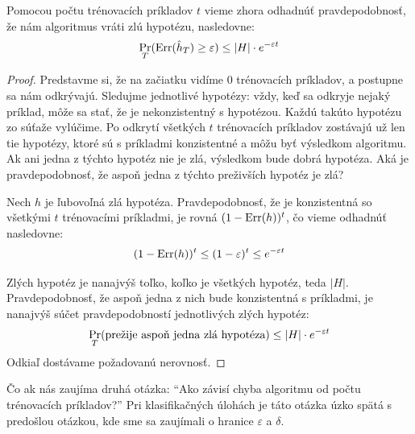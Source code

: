 \begin{theorem} \label{thm:badhypobound}
  Pomocou počtu trénovacích príkladov $t$ vieme zhora odhadnúť
  pravdepodobnosť, že nám algoritmus vráti zlú hypotézu, nasledovne:
  $$ \operatorname*{\textstyle\mathrm{Pr}}_T(\mathrm{Err}(\hat{h}_T) \geq \varepsilon) \leq |H| \cdot e^{-\varepsilon t} $$
\end{theorem}
\begin{proof}
  Predstavme si, že na začiatku vidíme $0$ trénovacích príkladov,
  a postupne sa nám odkrývajú. Sledujme jednotlivé hypotézy: vždy,
  keď sa odkryje nejaký príklad, môže sa stať, že je nekonzistentný
  s hypotézou. Každú takúto hypotézu zo súťaže vylúčime. Po odkrytí
  všetkých $t$ trénovacích príkladov zostávajú už len tie hypotézy,
  ktoré sú s príkladmi konzistentné a môžu byť výsledkom algoritmu.
  Ak ani jedna z týchto hypotéz nie je zlá, výsledkom bude dobrá
  hypotéza. Aká je pravdepodobnosť, že aspoň jedna z týchto preživších
  hypotéz je zlá?
  
  Nech $h$ je ľubovoľná zlá hypotéza. Pravdepodobnosť, že je konzistentná
  so všetkými $t$ trénovacími príkladmi, je rovná $(1 - \mathrm{Err}(h))^t$,
  čo vieme odhadnúť nasledovne:
  $$(1 - \mathrm{Err}(h))^t \leq (1 - \varepsilon)^t \leq e^{-\varepsilon t}$$
  
  Zlých hypotéz je nanajvýš toľko, koľko je všetkých hypotéz, teda
  $|H|$. Pravdepodobnosť, že aspoň jedna z nich bude konzistentná
  s príkladmi, je nanajvýš súčet pravdepodobností jednotlivých zlých
  hypotéz:
  $$\operatorname*{\textstyle\mathrm{Pr}}_T(\text{prežije aspoň jedna zlá hypotéza}) \leq |H| \cdot e^{-\varepsilon t}$$
  Odkiaľ dostávame požadovanú nerovnosť.
\end{proof}

Čo ak nás zaujíma druhá otázka: ``Ako závisí chyba algoritmu od počtu
trénovacích príkladov?'' Pri klasifikačných úlohách je táto otázka úzko
spätá s predošlou otázkou, kde sme sa zaujímali o hranice $\varepsilon$
a $\delta$.

